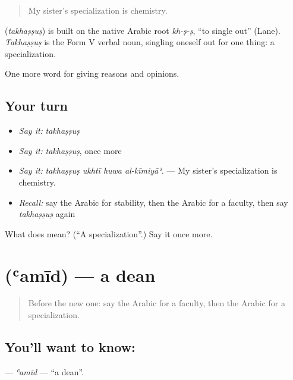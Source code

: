 \begin{quote}
My sister's specialization is chemistry.
\end{quote}

\begin{cousinweb}
\textbf{} (\emph{takhaṣṣuṣ}) is built on the native Arabic root \emph{kh-ṣ-ṣ}, \textquotedblleft{}to single out\textquotedblright{} (Lane). \emph{Takhaṣṣuṣ} is the Form V verbal noun, singling oneself out for one thing: a specialization.
\end{cousinweb}

\begin{grammarlens}[title={What you've built}]
One more word for giving reasons and opinions.
\end{grammarlens}

\subsection*{Your turn}
\begin{itemize}
\raggedright
  \item \emph{Say it:} \emph{takhaṣṣuṣ}
  \item \emph{Say it:} \emph{takhaṣṣuṣ}, once more
  \item \emph{Say it:} \emph{takhaṣṣuṣ ukhtī huwa al-kīmiyāʾ.} — My sister's specialization is chemistry.
  \item \emph{Recall:} say the Arabic for stability, then the Arabic for a faculty, then say \emph{takhaṣṣuṣ} again
\end{itemize}

\begin{tcolorbox}[breakable,colback=teal!4,colframe=teal!35!black,title={Before you move on}]
What does  mean? (\textquotedblleft{}A specialization\textquotedblright{}.) Say it once more.
\end{tcolorbox}
\section[\texorpdfstring{\ar{عميد} (ʿamīd)}{عميد (ʿamīd)}]{ (ʿamīd) — a dean}

\label{lesson:AR-C390-amid}



\begin{quote}
Before the new one: say the Arabic for a faculty, then the Arabic for a specialization.
\end{quote}

\subsection*{You'll want to know: }
\textbf{} — \emph{ʿamīd} — \textquotedblleft{}a dean\textquotedblright{}.

